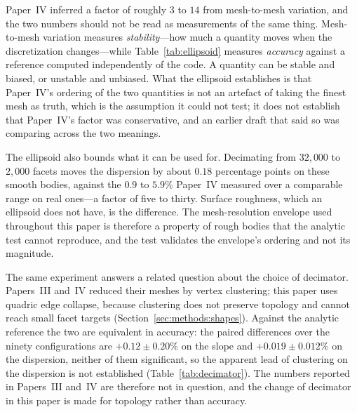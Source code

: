 Paper~IV inferred a factor of roughly $3$ to $14$ from mesh-to-mesh
variation, and the two numbers should not be read as measurements of the
same thing. Mesh-to-mesh variation measures \emph{stability}---how much a
quantity moves when the discretization changes---while
Table~\ref{tab:ellipsoid} measures \emph{accuracy} against a reference
computed independently of the code. A quantity can be stable and biased, or
unstable and unbiased. What the ellipsoid establishes is that Paper~IV's
ordering of the two quantities is not an artefact of taking the finest mesh
as truth, which is the assumption it could not test; it does not establish
that Paper~IV's factor was conservative, and an earlier draft that said so
was comparing across the two meanings.

The ellipsoid also bounds what it can be used for. Decimating from
$32{,}000$ to $2{,}000$ facets moves the dispersion by about $0.18$
percentage points on these smooth bodies, against the $0.9$ to $5.9\%$
Paper~IV measured over a comparable range on real ones---a factor of five to
thirty. Surface roughness, which an ellipsoid does not have, is the
difference. The mesh-resolution envelope used throughout this paper is
therefore a property of rough bodies that the analytic test cannot
reproduce, and the test validates the envelope's ordering and not its
magnitude.

The same experiment answers a related question about the choice of
decimator. Papers~III and~IV reduced their meshes by vertex clustering; this
paper uses quadric edge collapse, because clustering does not preserve
topology and cannot reach small facet targets
(Section~\ref{sec:methods:shapes}). Against the analytic reference the two
are equivalent in accuracy: the paired differences over the ninety
configurations are $+0.12\pm0.20\%$ on the slope and
$+0.019\pm0.012\%$ on the dispersion, neither of them significant, so the
apparent lead of clustering on the dispersion is not established
(Table~\ref{tab:decimator}). The numbers reported in Papers~III and~IV are
therefore not in question, and the change of decimator in this paper is made
for topology rather than accuracy.

